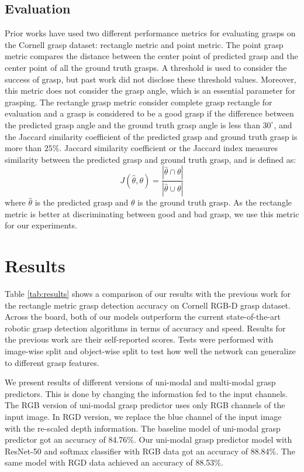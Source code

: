 \documentclass[10pt,twocolumn,letterpaper]{article}
\begin{document}
\subsection{Evaluation}
Prior works have used two different performance metrics for evaluating grasps on the Cornell grasp dataset: rectangle metric and point metric. The point grasp metric compares the distance between the center point of predicted grasp and the center point of all the ground truth grasps. A threshold is used to consider the success of grasp, but past work did not disclose these threshold values. Moreover, this metric does not consider the grasp angle, which is an essential parameter for grasping. The rectangle grasp metric consider complete grasp rectangle for evaluation and a grasp is considered to be a good grasp if the difference between the predicted grasp angle and the ground truth grasp angle is less than $30^{\circ}$, and the Jaccard similarity coefficient of the predicted grasp and ground truth grasp is more than $25\%$. Jaccard similarity coefficient or the Jaccard index measures similarity between the predicted grasp and ground truth grasp, and is defined as:
\begin{equation}
J(\widehat{\theta}, \theta) = \frac{| \widehat{\theta} \cap \theta|}{| \widehat{\theta} \cup \theta|}
\end{equation}
where $ \widehat{\theta}$ is the predicted grasp and $\theta$ is the ground truth grasp. As the rectangle metric is better at discriminating between good and bad grasp, we use this metric for our experiments.




\section{Results}
Table \ref{tab:results} shows a comparison of our results with the previous work for the rectangle metric grasp detection accuracy on Cornell RGB-D grasp dataset. Across the board, both of our models outperform the current state-of-the-art robotic grasp detection algorithms in terms of accuracy and speed. Results for the previous work are their self-reported scores. Tests were performed with image-wise split and object-wise split to test how well the network can generalize to different grasp features.

We present results of different versions of uni-modal and multi-modal grasp predictors. This is done by changing the information fed to the input channels. The RGB version of uni-modal grasp predictor uses only RGB channels of the input image. In RGD version, we replace the blue channel of the input image with the re-scaled depth information. The baseline model of uni-modal grasp predictor got an accuracy of 84.76\%. Our uni-modal grasp predictor model with ResNet-50 and softmax classifier with RGB data got an accuracy of 88.84\%. The same model with RGD data achieved an accuracy of 88.53\%.
\end{document}

